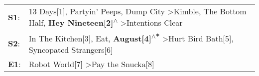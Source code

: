 \begin{supertabular}{p{0.03\textwidth}p{0.92\textwidth}}
 \textbf{S1}:  &  13 Days[1]\textsuperscript{}, \enspace Partyin' Peeps\textsuperscript{}, \enspace Dump City\textsuperscript{} \textgreater \enspace Kimble\textsuperscript{}, \enspace The Bottom Half\textsuperscript{}, \enspace \textbf{Hey Nineteen[2]\textsuperscript{$\wedge$}} \textgreater \enspace Intentions Clear\textsuperscript{}  \enspace  \\
 \textbf{S2}:  &                                                                                       In The Kitchen[3]\textsuperscript{}, \enspace Eat\textsuperscript{}, \enspace \textbf{August[4]\textsuperscript{$\wedge$*}} \textgreater \enspace Hurt Bird Bath[5]\textsuperscript{}, \enspace Syncopated Strangers[6]\textsuperscript{}  \enspace  \\
 \textbf{E1}:  &                                                                                                                                                                                                                                      Robot World[7]\textsuperscript{} \textgreater \enspace Pay the Snucka[8]\textsuperscript{}  \enspace  \\
\end{supertabular}
